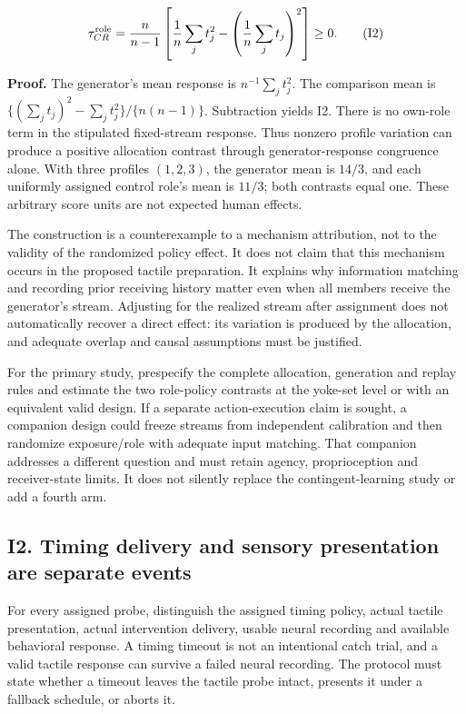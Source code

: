 \documentclass[
  american,
  11pt,
  letterpaper,
]{article}
\begin{document}
\begin{equation}
\tau_{CR}^{\rm role}
=\frac{n}{n-1}\left[
\frac{1}{n}\sum_j t_j^2-\left(\frac{1}{n}\sum_jt_j\right)^2
\right]\geq0.\tag{I2}
\end{equation}

\textbf{Proof.} The generator's mean response is \(n^{-1}\sum_jt_j^2\). The comparison mean is \(\{(\sum_jt_j)^2-\sum_jt_j^2\}/\{n(n-1)\}\). Subtraction yields I2. There is no own-role term in the stipulated fixed-stream response. Thus nonzero profile variation can produce a positive allocation contrast through generator-response congruence alone. With three profiles \((1,2,3)\), the generator mean is \(14/3\), and each uniformly assigned control role's mean is \(11/3\); both contrasts equal one. These arbitrary score units are not expected human effects.

The construction is a counterexample to a mechanism attribution, not to the validity of the randomized policy effect. It does not claim that this mechanism occurs in the proposed tactile preparation. It explains why information matching and recording prior receiving history matter even when all members receive the generator's stream. Adjusting for the realized stream after assignment does not automatically recover a direct effect: its variation is produced by the allocation, and adequate overlap and causal assumptions must be justified.

For the primary study, prespecify the complete allocation, generation and replay rules and estimate the two role-policy contrasts at the yoke-set level or with an equivalent valid design. If a separate action-execution claim is sought, a companion design could freeze streams from independent calibration and then randomize exposure/role with adequate input matching. That companion addresses a different question and must retain agency, proprioception and receiver-state limits. It does not silently replace the contingent-learning study or add a fourth arm.

\subsection{I2. Timing delivery and sensory presentation are separate events}\label{i2.-timing-delivery-and-sensory-presentation-are-separate-events}

For every assigned probe, distinguish the assigned timing policy, actual tactile presentation, actual intervention delivery, usable neural recording and available behavioral response. A timing timeout is not an intentional catch trial, and a valid tactile response can survive a failed neural recording. The protocol must state whether a timeout leaves the tactile probe intact, presents it under a fallback schedule, or aborts it.
\end{document}
